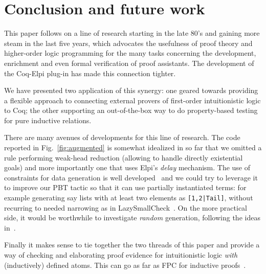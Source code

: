 \section{Conclusion and future work}

This paper follows on a line of research starting in the late 80's and
gaining more steam in the last five years, which advocates the
usefulness of proof theory and higher-order logic programming for the
many tasks concerning the development, enrichment and even formal
verification of proof assistants. The development of the Coq-Elpi
plug-in has made this connection tighter.

We have presented two application of this synergy: one geared towards
providing a flexible approach to connecting external provers of
first-order intuitionistic logic to Coq; the other supporting an out-of-the-box way to do property-based testing for pure inductive relations.
%


There are many avenues of developments for this line of research.
The code reported in Fig.~\ref{fig:augmented} is somewhat idealized in
so far that we omitted a rule performing weak-head reduction (allowing
to handle directly existential goals) and more importantly one that uses
 Elpi's \emph{delay} mechanism. %
The
use of constraints for data generation is well
developed~\cite{FioravantiPS15} and we could try to leverage it to
improve our PBT tactic so that it can use partially instantiated terms: for example generating
say lists with at least two elements as \texttt{[1,2|Tail]}, without
recurring to needed narrowing as in 
LazySmallCheck~\cite{smallcheck}. On the more practical side, it would be worthwhile to investigate \emph{random} generation, following the ideas in~\cite{pltredexconstraintlogic,blanco19ppdp}.


 Finally it makes sense to tie together the two threads of this paper
 and provide a way of checking and elaborating proof evidence for
 intuitionistic logic \emph{with} (inductively) defined atoms. This
 can go as far as FPC for inductive proofs~\cite{blanco15wof}.

